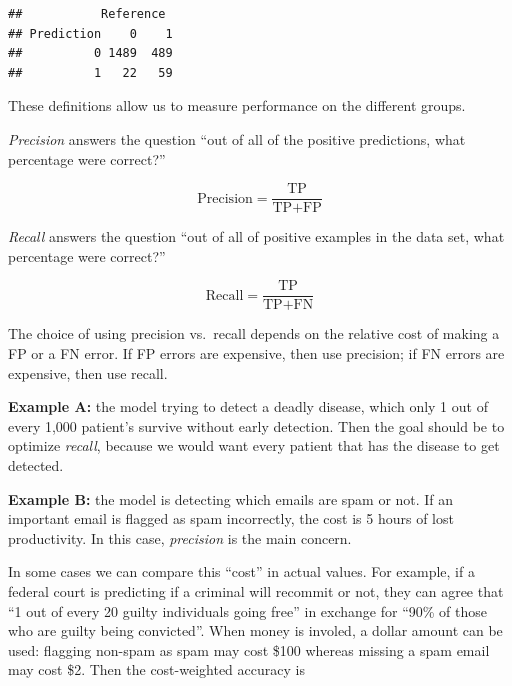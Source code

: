 \documentclass[openany]{book}
\newenvironment{Shaded}{\begin{snugshade}}{\end{snugshade}}
\newcommand{\KeywordTok}[1]{\textcolor[rgb]{0.13,0.29,0.53}{\textbf{#1}}}
\newcommand{\NormalTok}[1]{#1}
\newcommand{\OperatorTok}[1]{\textcolor[rgb]{0.81,0.36,0.00}{\textbf{#1}}}
\begin{document}
\begin{Shaded}
\end{Shaded}

\begin{verbatim}
##           Reference
## Prediction    0    1
##          0 1489  489
##          1   22   59
\end{verbatim}

These definitions allow us to measure performance on the different groups.

\emph{Precision} answers the question ``out of all of the positive predictions, what percentage were correct?''

\[\text{Precision} = \frac{\text{TP}}{\text{TP} + \text{FP}}\]

\emph{Recall} answers the question ``out of all of positive examples in the data set, what percentage were correct?''

\[\text{Recall} = \frac{\text{TP}}{\text{TP} + \text{FN}}\]

The choice of using precision vs.~recall depends on the relative cost of making a FP or a FN error. If FP errors are expensive, then use precision; if FN errors are expensive, then use recall.

\textbf{Example A:} the model trying to detect a deadly disease, which only 1 out of every 1,000 patient's survive without early detection. Then the goal should be to optimize \emph{recall}, because we would want every patient that has the disease to get detected.

\textbf{Example B:} the model is detecting which emails are spam or not. If an important email is flagged as spam incorrectly, the cost is 5 hours of lost productivity. In this case, \emph{precision} is the main concern.

In some cases we can compare this ``cost'' in actual values. For example, if a federal court is predicting if a criminal will recommit or not, they can agree that ``1 out of every 20 guilty individuals going free'' in exchange for ``90\% of those who are guilty being convicted''. When money is involed, a dollar amount can be used: flagging non-spam as spam may cost \$100 whereas missing a spam email may cost \$2. Then the cost-weighted accuracy is
\end{document}
